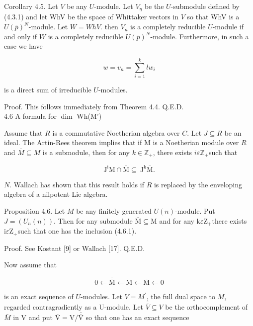 \documentclass[10pt]{article}
\begin{document}
Corollary 4.5. Let $V$ be any $U$-module. Let $V_{\eta}$ be the $U$-submodule defined by (4.3.1) and let WhV be the space of Whittaker vectors in $V$ so that WhV is a $U(\bar{p})^{N}$-module. Let $W=W h V$. then $V_{n}$ is a completely reducible $U$-module if and only if $W$ is a completely reducible $U(\bar{p})^{N}$-module. Furthermore, in such a case we have


\begin{equation*}
w=v_{n}=\sum_{i=1}^{k} l w_{i} \tag{4.5.4}
\end{equation*}


is a direct sum of irreducible $U$-modules.

Proof. This follows immediately from Theorem 4.4. Q.E.D.\\
4.6 A formula for $\operatorname{dim}$ Wh(M')

Assume that $R$ is a commutative Noetherian algebra over $C$. Let $J \subseteq R$ be an ideal. The Artin-Rees theorem implies that if M is a Noetherian module over $R$ and $\bar{M} \subseteq M$ is a submodule, then for any $k \in \mathbb{Z}_{+}$, there exists $i \varepsilon \mathbb{Z}_{+}$such that


\begin{equation*}
\mathrm{J}^{\mathrm{i}} \mathrm{M} \cap \overline{\mathrm{M}} \subseteq \mathrm{~J}^{\mathrm{k}} \overline{\mathrm{M}} . \tag{4.6.1}
\end{equation*}


$N$. Wallach has shown that this result holds if $R$ is replaced by the enveloping algebra of a nilpotent Lie algebra.

Proposition 4.6. Let $M$ be any finitely generated $U(n)$-module. Put $J=\left(U_{n}(n)\right)$. Then for any submodule $\overline{\mathrm{M}} \subseteq \mathrm{M}$ and for any $\mathrm{k} \varepsilon \mathrm{Z}_{+}$there exists $\mathrm{i} \varepsilon \mathrm{Z}_{+}$such that one has the inclusion (4.6.1).

Proof. See Kostant [9] or Wallach [17]. Q.E.D.

Now assume that


\begin{equation*}
0 \leftarrow \overline{\overline{\mathrm{M}}} \leftarrow \mathrm{M} \leftarrow \overline{\mathrm{M}} \leftarrow 0 \tag{4.6.2}
\end{equation*}


is an exact sequence of $U$-modules. Let $V=M^{\prime}$, the full dual space to $M$, regarded contragradiently as a U-module. Let $\overline{\bar{V}} \subseteq V$ be the orthocomplement of $\bar{M}$ in V and put $\overline{\mathrm{V}}=\mathrm{V} / \overline{\overline{\mathrm{V}}}$ so that one has an exact sequence
\end{document}
